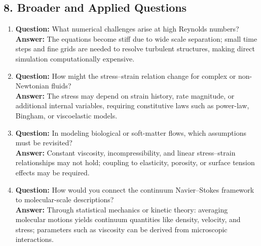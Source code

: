\documentclass[12pt]{article}
\begin{document}
\subsection*{8. Broader and Applied Questions}
\begin{enumerate}
\item \textbf{Question:} What numerical challenges arise at high Reynolds numbers?\\
\textbf{Answer:} The equations become stiff due to wide scale separation; small time steps and fine grids are needed to resolve turbulent structures, making direct simulation computationally expensive.

\item \textbf{Question:} How might the stress--strain relation change for complex or non-Newtonian fluids?\\
\textbf{Answer:} The stress may depend on strain history, rate magnitude, or additional internal variables, requiring constitutive laws such as power-law, Bingham, or viscoelastic models.

\item \textbf{Question:} In modeling biological or soft-matter flows, which assumptions must be revisited?\\
\textbf{Answer:} Constant viscosity, incompressibility, and linear stress--strain relationships may not hold; coupling to elasticity, porosity, or surface tension effects may be required.

\item \textbf{Question:} How would you connect the continuum Navier--Stokes framework to molecular-scale descriptions?\\
\textbf{Answer:} Through statistical mechanics or kinetic theory: averaging molecular motions yields continuum quantities like density, velocity, and stress; parameters such as viscosity can be derived from microscopic interactions.
\end{enumerate}
\end{document}
